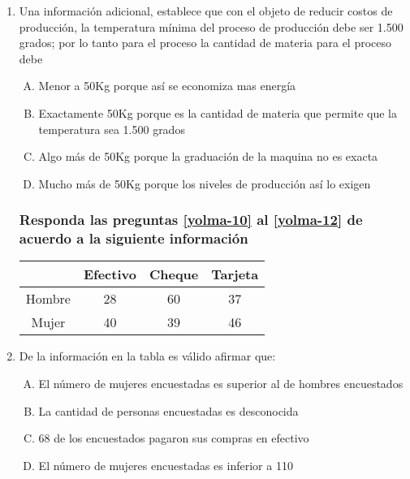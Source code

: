 \begin{enumerate}

\newpage

\item Una información adicional, establece que con el objeto de reducir costos de producción, la temperatura mínima del proceso de producción debe ser 1.500 grados; por lo tanto para el proceso  la cantidad de materia para el proceso debe \label{yolma-9}\\

\begin{enumerate}[(A)]
\item  Menor a 50Kg porque así se economiza mas energía
\item Exactamente 50Kg porque es la cantidad de materia que permite que la temperatura sea 1.500 grados
\item Algo más de 50Kg porque la graduación de la maquina no es exacta
\item Mucho más de 50Kg porque los niveles de producción así lo exigen
\end{enumerate}


\subsubsection*{Responda las preguntas \ref{yolma-10} al \ref{yolma-12} de acuerdo a la siguiente información}

\begin{center}
\begin{tabular}{c|ccc}
\hline 
\hline 
 & Efectivo & Cheque & Tarjeta \\ 
\hline 
\hline 
Hombre & 28 & 60 & 37 \\ 
Mujer & 40 & 39 & 46 \\ 
\hline 
\hline 
\end{tabular} 
\end{center}
\item  De la información en la tabla es válido afirmar que: \label{yolma-10}\\

\begin{enumerate}[(A)]
\item  El número de mujeres encuestadas es superior al de hombres encuestados
\item La cantidad de personas encuestadas es desconocida
\item 68 de los encuestados pagaron sus compras en efectivo
\item El número de mujeres encuestadas es inferior a 110
\end{enumerate}


\end{enumerate}
